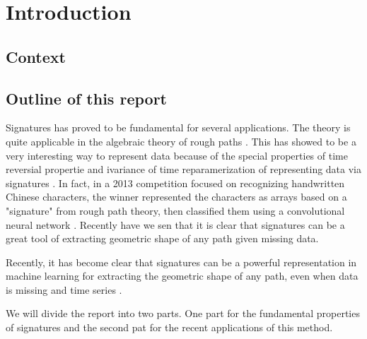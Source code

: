 \section{Introduction}\label{sec:introduction}

\subsection{Context}%
\label{sub:context}




\subsection{Outline of this report}%
\label{sub:outline_of_this_report}

Signatures has proved to be fundamental for several applications.
The theory is quite applicable in the algebraic theory of rough paths \cite{geng2021introduction}. This has showed to be a very interesting way to represent data because of the special properties of time reversial propertie and ivariance of time
reparamerization of representing data via signatures \cite{chevyrev2016primer}. In fact, in a
2013 competition focused on recognizing handwritten Chinese characters, the winner represented the characters as arrays based on a "signature" from rough path theory, then classified them using a convolutional neural network \cite{yin2013icdar}.
Recently have we sen that it is clear that signatures can be a great tool of extracting geometric shape of any path given missing data.

Recently, it has become clear that signatures can be a powerful representation in machine learning for extracting the geometric shape of any path, even when data is missing \cite{chevyrev2016primer} and time series . 



We will divide the report into two parts. One part for the fundamental properties of signatures and the second pat for the recent applications of this method.




